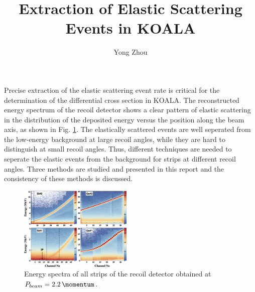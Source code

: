 \documentclass[fleqn,twocolumn,a4paper]{ikpar}
\begin{document}
\parindent=0pt
\frenchspacing

\title{{\bf
    Extraction of Elastic Scattering Events in KOALA
}}
\author{Yong Zhou
}

\maketitle

Precise extraction of the elastic scattering event rate is critical for the
determination of the differential cross section in KOALA.
The reconstructed energy spectrum of the recoil detector shows a clear pattern of
elastic scattering in the distribution of the deposited energy versus the position along the beam axis, as shown in Fig. \ref{fig:energy_vs_strips}.
The elastically scattered events are well seperated from the low-energy background at large
recoil angles, while they are hard to distinguish at small recoil angles.
Thus, different techniques are needed to seperate the elastic events from the
background for strips at different recoil angles.
Three methods are studied and presented in this report and the consistency of these methods is discussed.
\begin{figure}[b!]
	\includegraphics[width=0.48\textwidth]{./energy_vs_strips.png}
  \caption{Energy spectra of all strips of the recoil detector obtained at
    $P_{beam} = \SI{2.2}{\momentum}$.}
  \label{fig:energy_vs_strips}
\end{figure}

\par
\medskip
\end{document}
